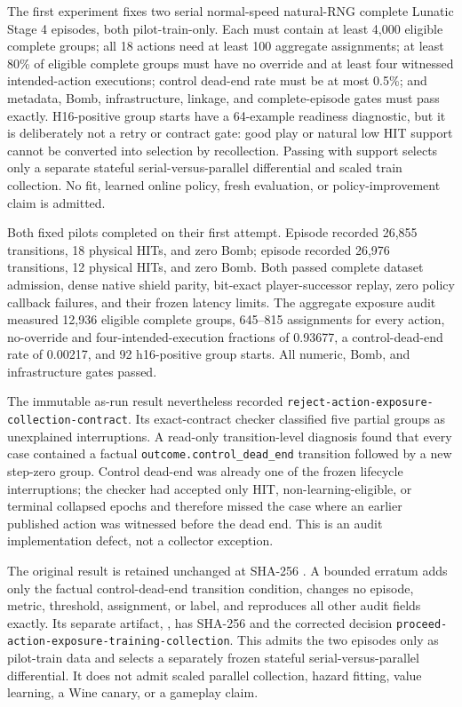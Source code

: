 \documentclass[11pt]{article}
\begin{document}
The first experiment fixes two serial normal-speed natural-RNG complete
Lunatic Stage 4 episodes, both pilot-train-only.  Each must contain at least
4,000 eligible complete groups; all 18 actions need at least 100 aggregate
assignments; at least 80\% of eligible complete groups must have no override
and at least four witnessed intended-action executions; control dead-end rate
must be at most 0.5\%; and metadata, Bomb, infrastructure, linkage, and
complete-episode gates must pass exactly.  H16-positive group starts have a
64-example readiness diagnostic, but it is deliberately not a retry or
contract gate: good play or natural low HIT support cannot be converted into
selection by recollection.  Passing with support selects only a separate
stateful serial-versus-parallel differential and scaled train collection.
No fit, learned online policy, fresh evaluation, or policy-improvement claim is
admitted.

Both fixed pilots completed on their first attempt.  Episode
 recorded 26,855 transitions, 18 physical
HITs, and zero Bomb; episode  recorded
26,976 transitions, 12 physical HITs, and zero Bomb.  Both passed complete
dataset admission, dense native shield parity, bit-exact player-successor
replay, zero policy callback failures, and their frozen latency limits.  The
aggregate exposure audit measured 12,936 eligible complete groups, 645--815
assignments for every action, no-override and four-intended-execution fractions
of 0.93677, a control-dead-end rate of 0.00217, and 92 h16-positive group
starts.  All numeric, Bomb, and infrastructure gates passed.

The immutable as-run result nevertheless recorded
\texttt{reject-action-exposure-collection-contract}.  Its exact-contract
checker classified five partial groups as unexplained interruptions.  A
read-only transition-level diagnosis found that every case contained a factual
\texttt{outcome.control\_dead\_end} transition followed by a new step-zero
group.  Control dead-end was already one of the frozen lifecycle interruptions;
the checker had accepted only HIT, non-learning-eligible, or terminal collapsed
epochs and therefore missed the case where an earlier published action was
witnessed before the dead end.  This is an audit implementation defect, not a
collector exception.

The original result is retained unchanged at SHA-256
.
A bounded erratum adds only the factual control-dead-end transition condition,
changes no episode, metric, threshold, assignment, or label, and reproduces all
other audit fields exactly.  Its separate artifact,
, has
SHA-256
and the corrected decision
\texttt{proceed-action-exposure-training-collection}.  This admits the two
episodes only as pilot-train data and selects a separately frozen stateful
serial-versus-parallel differential.  It does not admit scaled parallel
collection, hazard fitting, value learning, a Wine canary, or a gameplay claim.
\end{document}
